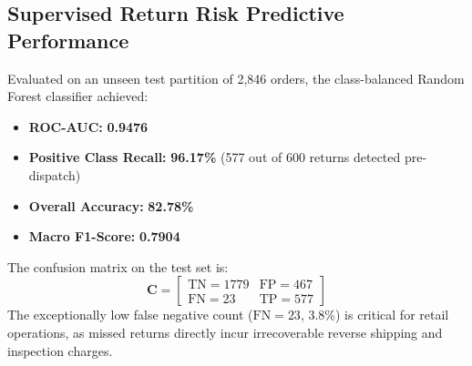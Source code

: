 \documentclass[conference]{IEEEtran}
\begin{document}
\begin{table}[t]
\centering
\caption{Customer Persona Archetypes Discovered by 12-D RFM-E}
\label{tab:persona_metrics}
\end{table}

\subsection{Supervised Return Risk Predictive Performance}
Evaluated on an unseen test partition of 2,846 orders, the class-balanced Random Forest classifier achieved:
\begin{itemize}
    \item \textbf{ROC-AUC:} \textbf{0.9476}
    \item \textbf{Positive Class Recall:} \textbf{96.17\%} (577 out of 600 returns detected pre-dispatch)
    \item \textbf{Overall Accuracy:} \textbf{82.78\%}
    \item \textbf{Macro F1-Score:} \textbf{0.7904}
\end{itemize}

The confusion matrix on the test set is:
\begin{equation}
\mathbf{C} = \begin{bmatrix}
\text{TN} = 1779 & \text{FP} = 467 \\
\text{FN} = 23 & \text{TP} = 577
\end{bmatrix}
\end{equation}
The exceptionally low false negative count ($\text{FN}=23$, 3.8\%) is critical for retail operations, as missed returns directly incur irrecoverable reverse shipping and inspection charges.
\end{document}
